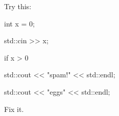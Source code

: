 Try this:\\

\begin{console}

int x = 0;

std::cin >> x;

if x > 0

   std::cout << "spam!" << std::endl;

std::cout << "eggs" << std::endl;

\end{console}

Fix it.

